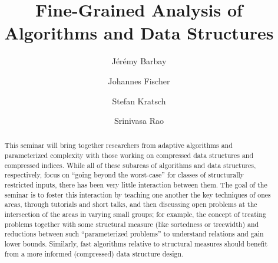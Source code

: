 \documentclass[a4paper,10pt]{article}
\begin{document}
\title{Fine-Grained Analysis of Algorithms and Data Structures}


\author{J\'er\'emy Barbay \and Johannes Fischer \and Stefan Kratsch \and Srinivasa Rao }

\maketitle              %

\begin{abstract}
This seminar will bring together researchers from adaptive algorithms and parameterized complexity with those working on compressed data structures and compressed indices. While all of these subareas of algorithms and data structures, respectively, focus on ``going beyond the worst-case'' for classes of structurally restricted inputs, there has been very little interaction between them. The goal of the seminar is to foster this interaction by teaching one another the key techniques of ones areas, through tutorials and short talks, and then discussing open problems at the intersection of the areas in varying small groups; for example, the concept of treating problems together with some structural measure (like sortedness or treewidth) and reductions between such ``parameterized problems'' to understand relations and gain lower bounds. Similarly, fast algorithms relative to structural measures should benefit from a more informed (compressed) data structure design.
\end{abstract}

\end{document}
